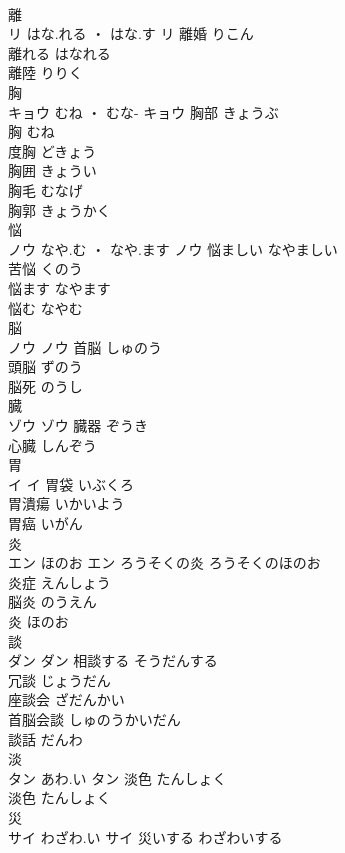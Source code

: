 \documentclass[8pt]{extreport}
\begin{document}
\begin{CJK}{UTF8}{min}
\\	離	
\\	リ	はな.れる ・ はな.す	リ	離婚	りこん	
\\	離れる	はなれる	
\\	離陸	りりく	
\\	胸	
\\	キョウ	むね ・ むな-	キョウ	胸部	きょうぶ	
\\	胸	むね	
\\	度胸	どきょう	
\\	胸囲	きょうい	
\\	胸毛	むなげ	
\\	胸郭	きょうかく	
\\	悩	
\\	ノウ	なや.む ・ なや.ます	ノウ	悩ましい	なやましい	
\\	苦悩	くのう	
\\	悩ます	なやます	
\\	悩む	なやむ	
\\	脳	
\\	ノウ		ノウ	首脳	しゅのう	
\\	頭脳	ずのう	
\\	脳死	のうし	
\\	臓	
\\	ゾウ		ゾウ													臓器	ぞうき	
\\	心臓	しんぞう	
\\	胃	
\\	イ		イ	胃袋	いぶくろ	
\\	胃潰瘍	いかいよう	
\\	胃癌	いがん	
\\	炎	
\\	エン	ほのお	エン	ろうそくの炎	ろうそくのほのお	
\\	炎症	えんしょう	
\\	脳炎	のうえん	
\\	炎	ほのお	
\\	談	
\\	ダン		ダン	相談する	そうだんする	
\\	冗談	じょうだん	
\\	座談会	ざだんかい	
\\	首脳会談	しゅのうかいだん	
\\	談話	だんわ	
\\	淡	
\\	タン	あわ.い	タン	淡色	たんしょく	
\\	淡色	たんしょく	
\\	災	
\\	サイ	わざわ.い	サイ	災いする	わざわいする	

\end{CJK}
\end{document}
